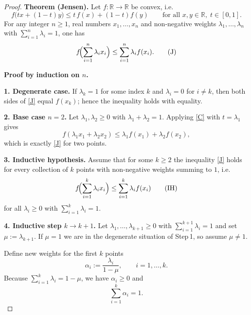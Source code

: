\begin{proof}
\textbf{Theorem (Jensen).}  
Let $f:\mathbb R\to\mathbb R$ be convex, i.e.
\[
f\big(t x+(1-t)y\big)\le t\,f(x)+(1-t)f(y)\qquad\text{for all }x,y\in\mathbb R,\;t\in[0,1].
\tag{C}
\]
For any integer $n\ge1$, real numbers $x_{1},\dots,x_{n}$ and non‑negative
weights $\lambda_{1},\dots,\lambda_{n}$ with $\sum_{i=1}^{n}\lambda_{i}=1$, one has
\[
f\!\Bigl(\sum_{i=1}^{n}\lambda_{i}x_{i}\Bigr)\le
\sum_{i=1}^{n}\lambda_{i}f(x_{i}).\tag{J}
\]

\medskip
\textbf{Proof by induction on $n$.}

\textbf{1. Degenerate case.}  
If $\lambda_{k}=1$ for some index $k$ and $\lambda_{i}=0$ for $i\neq k$, then both sides of \eqref{J} equal $f(x_{k})$; hence the inequality holds with equality.

\medskip
\textbf{2. Base case $n=2$.}  
Let $\lambda_{1},\lambda_{2}\ge0$ with $\lambda_{1}+\lambda_{2}=1$. Applying \eqref{C} with $t=\lambda_{1}$ gives
\[
f(\lambda_{1}x_{1}+\lambda_{2}x_{2})
\le \lambda_{1}f(x_{1})+\lambda_{2}f(x_{2}),
\]
which is exactly \eqref{J} for two points.

\medskip
\textbf{3. Inductive hypothesis.}  
Assume that for some $k\ge2$ the inequality \eqref{J} holds for every collection of $k$ points with non‑negative weights summing to $1$, i.e.
\[
f\!\Bigl(\sum_{i=1}^{k}\lambda_{i}x_{i}\Bigr)
   \le \sum_{i=1}^{k}\lambda_{i}f(x_{i})\tag{IH}
\]
for all $\lambda_{i}\ge0$ with $\sum_{i=1}^{k}\lambda_{i}=1$.

\medskip
\textbf{4. Inductive step $k\to k+1$.}  
Let $\lambda_{1},\dots,\lambda_{k+1}\ge0$ with $\sum_{i=1}^{k+1}\lambda_{i}=1$ and set $\mu:=\lambda_{k+1}$. If $\mu=1$ we are in the degenerate situation of Step 1, so assume $\mu\neq1$.

Define new weights for the first $k$ points
\[
\alpha_{i}:=\frac{\lambda_{i}}{1-\mu},\qquad i=1,\dots,k .
\]
Because $\sum_{i=1}^{k}\lambda_{i}=1-\mu$, we have $\alpha_{i}\ge0$ and
\[
\sum_{i=1}^{k}\alpha_{i}=1 .
\]


\end{proof}
